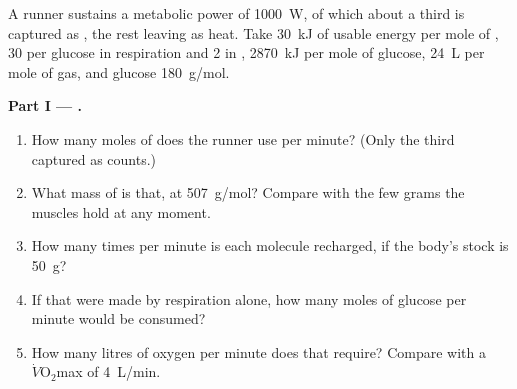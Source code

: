 \begin{problem}
\label{pb:g12:respiration-fermentation:1}
A runner sustains a metabolic power of \qty{1000}{W}, of which about
a third is captured as , the rest leaving as heat. Take
\qty{30}{kJ} of usable energy per mole of , 30  per glucose in
respiration and 2 in , \qty{2870}{kJ} per mole of glucose,
\qty{24}{L} per mole of gas, and glucose \qty{180}{g/mol}.

\medskip
\noindent\textbf{Part I --- .}
\begin{enumerate}
  \item How many moles of  does the runner use per minute?
        (Only the third captured as  counts.)
  \item What mass of  is that, at \qty{507}{g/mol}? Compare with the
        few grams the muscles hold at any moment.
  \item How many times per minute is each  molecule recharged, if
        the body's stock is \qty{50}{g}?
  \item If that  were made by respiration alone, how many moles of
        glucose per minute would be consumed?
  \item How many litres of oxygen per minute does that require?
        Compare with a $\dot V\!\mathrm{O_2}$max of \qty{4}{L/min}.
\end{enumerate}


\end{problem}
